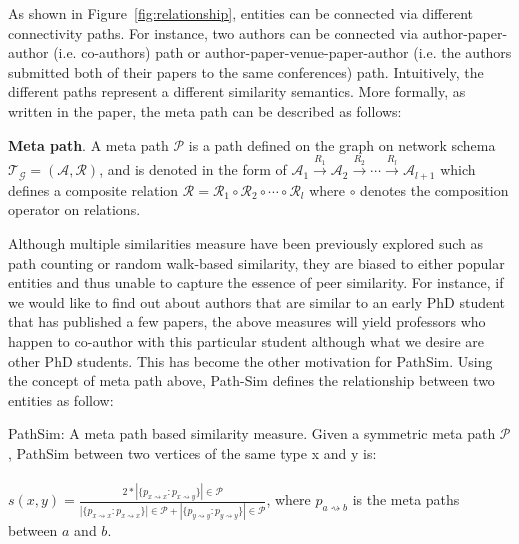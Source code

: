 As shown in Figure~\ref{fig:relationship}, entities can be connected via
different connectivity paths. For instance, two authors can be connected via
author-paper-author (i.e. co-authors) path or author-paper-venue-paper-author
(i.e.  the authors submitted both of their papers to the same conferences)
path. Intuitively, the different paths represent a different similarity
semantics. More formally, as written in the paper, the meta path can be
described as follows:

\begin{Def}
\label{meta path}
\textbf{Meta path}. A meta path $\mathcal{P}$ is a path defined on the graph on
network schema $\mathcal{T_G} = \mathcal{(A, R)}$, and is denoted in the form
of $\mathcal{A}_1 \xrightarrow{R_1} \mathcal{A}_2 \xrightarrow{R_2} \cdots
\xrightarrow{R_l} \mathcal{A}_{l + 1}$ which defines a composite relation
$\mathcal{R} = \mathcal{R}_1 \circ \mathcal{R}_2 \circ \cdots \circ
\mathcal{R}_l$ where $\circ$ denotes the composition operator on relations.
\end{Def}

Although multiple similarities measure have been previously explored such as
path counting or random walk-based similarity, they are biased to either
popular entities and thus unable to capture the essence of peer similarity.
For instance, if we would like to find out about authors that are similar to
an early PhD student that has published a few papers, the above measures
will yield professors who happen to co-author with this particular student
although what we desire are other PhD students. This has become the other
motivation for PathSim. Using the concept of meta path above, Path-Sim
defines the relationship between two entities as follow:

\begin{Def}
\label{path-sim}
PathSim: A meta path based similarity measure. Given a symmetric
meta path $\mathcal{P}$, PathSim between two vertices of the same type
x and y is:

\paragraph{}$s(x,y)=\frac{2*|\{p_{x \rightsquigarrow x}:p_{x \rightsquigarrow y}\}|\in\mathcal{P}}
{|\{p_{x \rightsquigarrow x}:p_{x \rightsquigarrow x}\}|\in\mathcal{P} +
|\{p_{y \rightsquigarrow y}:p_{y \rightsquigarrow y}\}|\in\mathcal{P}}$, where $p_{a \rightsquigarrow b}$ is the meta paths between $a$ and $b$.
\end{Def}

